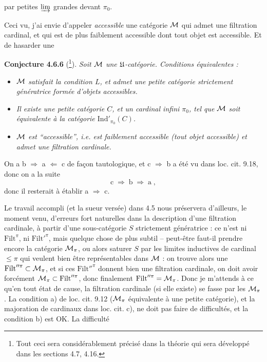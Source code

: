 
par petites $\varinjlim$ grandes devant $\pi_0$.

Ceci vu, j'ai envie d'appeler \textit{accessible} une catégorie $\mathcal{M}$ qui admet une filtration cardinal, et qui est de plus faiblement accessible dont tout objet est accessible. Et de hasarder une %

\textbf{Conjecture 4.6.6} (\footnote[61]{Tout ceci sera considérablement précisé dans la théorie qui sera développé dans les sections 4.7, 4.16.}). \textit{Soit $\mathcal{M}$ une $\mathfrak{U}$-catégorie. Conditions équivalentes :} %
\begin{itemize}[leftmargin=4em]
\item[\textit{a)}] \textit{$\mathcal{M}$ satisfait la condition $L$, et admet une petite catégorie strictement génératrice formée d'objets accessibles.}
\item[\llap{$\Uparrow$\ }\textit{b)}] \textit{Il existe une petite catégorie $C$, et un cardinal infini $\pi_0$, tel que $\mathcal{M}$ soit équivalente à la catégorie $\mathrm{Ind}'_{\pi_0}(C)$.}
\item[\llap{$\Uparrow$\ }\textit{c)}] \textit{$\mathcal{M}$ est “accessible”, i.e. est faiblement accessible (tout objet accessible) et admet une filtration cardinale.}
\end{itemize}
On a b $\Longrightarrow$ a $\Longleftarrow$ c de façon tautologique, et c $\Longrightarrow$ b a été vu dans loc. cit. 9.18, donc on a la suite
\[
\mathrm{c} \;\Longrightarrow\; \mathrm{b} \;\Longrightarrow\; \mathrm{a}\;,
\]
donc il resterait à établir a $\Longrightarrow$ c.


Le travail accompli (et la sueur versée) dans 4.5 nous préservera d'ailleurs, le moment venu, d'erreurs fort naturelles dans la description d'une filtration cardinale, à partir d'une sous-catégorie $S$ strictement génératrice : ce n'est ni $\mathrm{Filt}^{\pi}$, ni $\mathrm{Filt}'^{\pi}$, mais quelque chose de plus subtil -- peut-être faut-il prendre encore la catégorie $\mathcal{M}_{\pi}$, ou alors saturer $S$ par les limites inductives de cardinal $\leqslant \pi$ qui veulent bien être représentables dans $\mathcal{M}$ : on trouve alors une $\mathrm{Filt}''^{\pi} \subset \mathcal{M}_{\pi}$, et si ces $\mathrm{Filt}''^{\pi}$ donnent bien une filtration cardinale, on doit avoir forcément $\mathcal{M}_{\pi} \subset \mathrm{Filt}''^{\pi}$, donc finalement $\mathrm{Filt}''^{\pi} = \mathcal{M}_{\pi}$. Donc je m'attends à ce qu'en tout état de cause, la filtration cardinale (si elle existe) se fasse par les $\mathcal{M}_{\pi}$. La condition a) de loc. cit. 9.12 ($\mathcal{M}_{\pi}$ équivalente à une petite catégorie), et la majoration de cardinaux dans loc. cit. c), ne doit pas faire de difficultés, et la condition b) est OK. La difficulté

